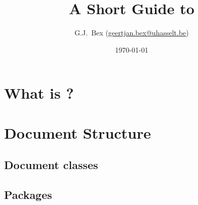 \documentclass[11pt,a4paper,oneside]{book}
\begin{document}
\frontmatter
\title{A Short Guide to \LaTeXe{}}
\author{G.J.\ Bex (\url{geertjan.bex@uhasselt.be})}
\date{\today}

\maketitle
\tableofcontents

\mainmatter
\chapter{What is \LaTeXe{}?}
\label{ch:what-is-latex}

\chapter{Document Structure}
\label{ch:doc-struct}
\section{Document classes}
\label{sec:doc-classes}
\section{Packages}
\label{sec:packages}
\end{document}
